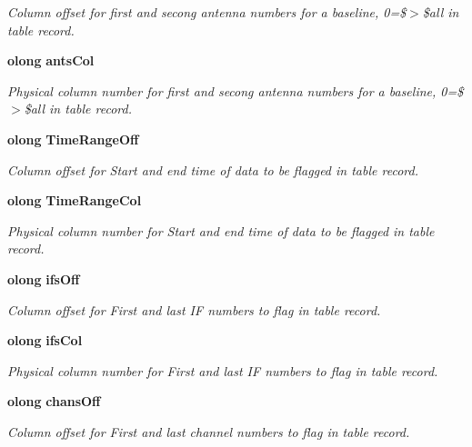 \begin{CompactItemize}
\begin{CompactList}\small\item\em Column offset for first and secong antenna numbers for a baseline, 0=\$$>$\$all in table record. \item\end{CompactList}\item 
{\bf olong} {\bf ants\-Col}
\begin{CompactList}\small\item\em Physical column number for first and secong antenna numbers for a baseline, 0=\$$>$\$all in table record. \item\end{CompactList}\item 
{\bf olong} {\bf Time\-Range\-Off}
\begin{CompactList}\small\item\em Column offset for Start and end time of data to be flagged in table record. \item\end{CompactList}\item 
{\bf olong} {\bf Time\-Range\-Col}
\begin{CompactList}\small\item\em Physical column number for Start and end time of data to be flagged in table record. \item\end{CompactList}\item 
{\bf olong} {\bf ifs\-Off}
\begin{CompactList}\small\item\em Column offset for First and last IF numbers to flag in table record. \item\end{CompactList}\item 
{\bf olong} {\bf ifs\-Col}
\begin{CompactList}\small\item\em Physical column number for First and last IF numbers to flag in table record. \item\end{CompactList}\item 
{\bf olong} {\bf chans\-Off}
\begin{CompactList}\small\item\em Column offset for First and last channel numbers to flag in table record. \item\end{CompactList}\item 

\end{CompactItemize}
